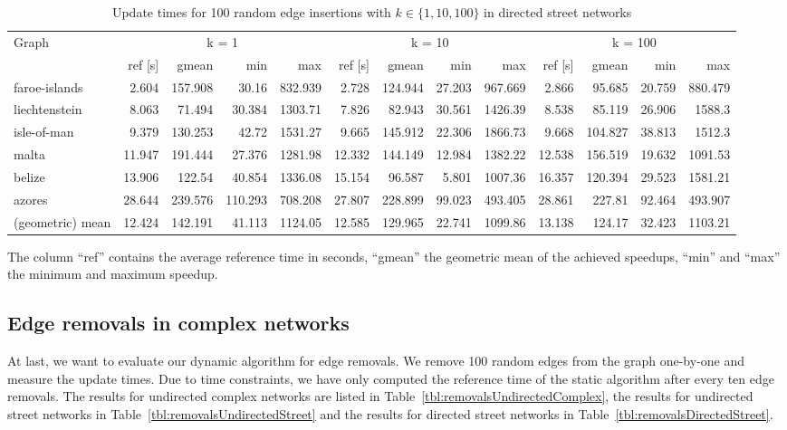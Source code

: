 \begin{landscape}
\begin{table}[h!]
\centering
\begin{tabular}{l|rrrr|rrrr|rrrr}
\toprule
Graph & \multicolumn{4}{c|}{k = 1} & \multicolumn{4}{c|}{k = 10} & \multicolumn{4}{c}{k = 100}\\
                &     ref [s] &   gmean &   min &     max &     ref [s] &   gmean &   min &     max &     ref [s] &   gmean &   min &     max \\
\midrule \midrule
 faroe-islands    &  2.604 & 157.908 &  30.16  &  832.939 &  2.728 & 124.944 & 27.203 &  967.669 &  2.866 &  95.685 & 20.759 &  880.479 \\
 liechtenstein    &  8.063 &  71.494 &  30.384 & 1303.71  &  7.826 &  82.943 & 30.561 & 1426.39  &  8.538 &  85.119 & 26.906 & 1588.3   \\
 isle-of-man      &  9.379 & 130.253 &  42.72  & 1531.27  &  9.665 & 145.912 & 22.306 & 1866.73  &  9.668 & 104.827 & 38.813 & 1512.3   \\
 malta            & 11.947 & 191.444 &  27.376 & 1281.98  & 12.332 & 144.149 & 12.984 & 1382.22  & 12.538 & 156.519 & 19.632 & 1091.53  \\
 belize           & 13.906 & 122.54  &  40.854 & 1336.08  & 15.154 &  96.587 &  5.801 & 1007.36  & 16.357 & 120.394 & 29.523 & 1581.21  \\
 azores           & 28.644 & 239.576 & 110.293 &  708.208 & 27.807 & 228.899 & 99.023 &  493.405 & 28.861 & 227.81  & 92.464 &  493.907 \\ \midrule \midrule
 (geometric) mean & 12.424 & 142.191 &  41.113 & 1124.05  & 12.585 & 129.965 & 22.741 & 1099.86  & 13.138 & 124.17  & 32.423 & 1103.21  \\
\bottomrule
\end{tabular}
\caption{Update times for 100 random edge insertions with  $k \in \{1, 10, 100\}$ in directed street networks}{The column ``ref'' contains the average reference time in seconds, ``gmean'' the geometric mean of the achieved speedups, ``min'' and ``max'' the minimum and maximum speedup.}
\label{tbl:resultsStreetNetworksDirected}
\end{table}

\end{landscape}

\subsection{Edge removals in complex networks}
At last, we want to evaluate our dynamic algorithm for edge removals. We remove 100 random edges from the graph one-by-one and measure the update times. Due to time constraints, we have only computed the reference time of the static algorithm after every ten edge removals. The results for undirected complex networks are listed in Table~\ref{tbl:removalsUndirectedComplex}, the results for undirected street networks in Table~\ref{tbl:removalsUndirectedStreet} and the results for directed street networks in Table~\ref{tbl:removalsDirectedStreet}.

